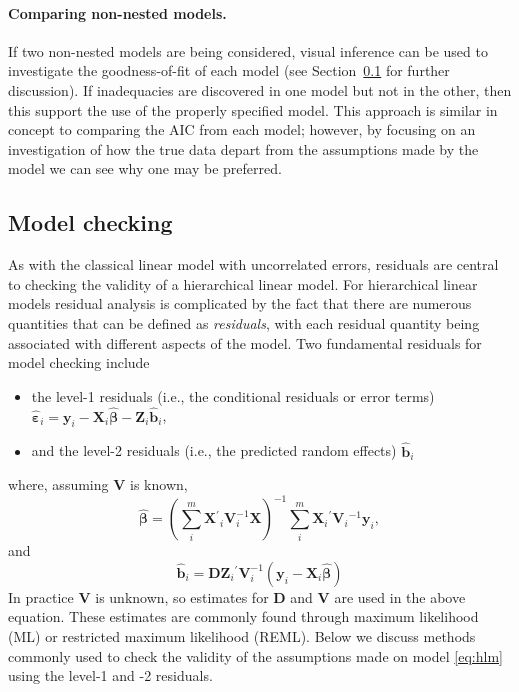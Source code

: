 \documentclass{article} %
\newcommand{\inv}{\ensuremath{^{-1}}}
\newcommand{\trans}{\ensuremath{^\prime}}
\begin{document}
\paragraph{Comparing non-nested models.}
If two non-nested models are being considered, visual inference can be used to investigate the goodness-of-fit of each model (see Section~\ref{sec:checking} for further discussion). If inadequacies are discovered in one model but not in the other, then this support the use of the properly specified model. This approach is similar in concept to comparing the AIC from each model; however, by focusing on an investigation of how the true data depart from the assumptions made by the model we can see why one may be preferred.


\subsection{Model checking}\label{sec:checking}

As with the classical linear model with uncorrelated errors, residuals are central to checking the validity of a hierarchical linear model. For hierarchical linear models residual analysis is complicated by the fact that there are numerous quantities that can be defined as \emph{residuals}, with each residual quantity being associated with different aspects of the model. Two fundamental residuals for model checking include
%
\begin{itemize}
\item the level-1 residuals (i.e., the conditional residuals or error terms) $\widehat{\bm{\varepsilon}}_i = \bm{y}_i - \bm{X}_i \widehat{\bm{\beta}} - \bm{Z}_i \widehat{\bm{b}}_i$,

\item and the level-2 residuals (i.e., the predicted random effects) $\widehat{\bm{b}}_i$
\end{itemize}
%
where, assuming $\bm{V}$ is known,
\begin{equation}\label{eq:glsb}
	\widehat{\bm{\beta}} = 
	\left(\sum^m_i \bm{X}\trans_i \bm{V}^{-1}_i \bm{X} \right)^{-1} 
	\sum^m_i \bm{X}_i\trans \bm{V}_i\inv \bm{y}_i,
\end{equation}
and
\begin{equation}\label{eq:eb}
	\widehat{\bm{b}}_i = \bm{D} \bm{Z}_i\trans \bm{V}_i^{-1} 
	\left(\bm{y}_i - \bm{X}_i \widehat{\bm{\beta}} \right)
\end{equation}
%
In practice $\bm{V}$ is unknown, so estimates for $\bm{D}$ and $\bm{V}$ are used in the above equation. These estimates are commonly found through maximum likelihood (ML) or restricted maximum likelihood (REML). Below we discuss methods commonly used to check the validity of the assumptions made on model \eqref{eq:hlm} using the level-1 and -2 residuals.
\end{document}
